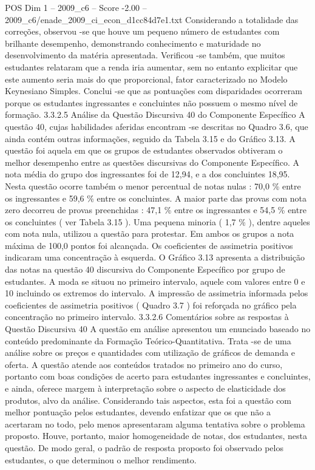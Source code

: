 \begin{textsample}{POS Dim 1 – 2009\_c6 – Score -2.00 – 2009\_c6/enade\_2009\_ci\_econ\_d1cc84d7e1.txt}
Considerando a totalidade das correções, observou -se que houve um pequeno número de estudantes com brilhante desempenho, demonstrando conhecimento e maturidade no desenvolvimento da matéria apresentada.
Verificou -se também, que muitos estudantes relataram que a renda iria aumentar, sem no entanto explicitar que este aumento seria mais do que proporcional, fator caracterizado no Modelo Keynesiano Simples.
Conclui -se que as pontuações com disparidades ocorreram porque os estudantes ingressantes e concluintes não possuem o mesmo nível de formação. 3.3.2.5 Análise da Questão Discursiva 40 do Componente Específico A questão 40, cujas habilidades aferidas encontram -se descritas no Quadro 3.6, que ainda contém outras informações, seguido da Tabela 3.15 e do Gráfico 3.13.
A questão foi aquela em que os grupos de estudantes observados obtiveram o melhor desempenho entre as questões discursivas do Componente Específico.
A nota média do grupo dos ingressantes foi de 12,94, e a dos concluintes 18,95.
Nesta questão ocorre também o menor percentual de notas nulas : 70,0 \% entre os ingressantes e 59,6 \% entre os concluintes.
A maior parte das provas com nota zero decorreu de provas preenchidas : 47,1 \% entre os ingressantes e 54,5 \% entre os concluintes ( ver Tabela 3.15 ).
Uma pequena minoria ( 1,7 \% ), dentre aqueles com nota nula, utilizou a questão para protestar.
Em ambos os grupos a nota máxima de 100,0 pontos foi alcançada.
Os coeficientes de assimetria positivos indicaram uma concentração à esquerda.
O Gráfico 3.13 apresenta a distribuição das notas na questão 40 discursiva do Componente Específico por grupo de estudantes.
A moda se situou no primeiro intervalo, aquele com valores entre 0 e 10 incluindo os extremos do intervalo.
A impressão de assimetria informada pelos coeficientes de assimetria positivos ( Quadro 3.7 ) foi reforçada no gráfico pela concentração no primeiro intervalo. 3.3.2.6 Comentários sobre as respostas à Questão Discursiva 40 A questão em análise apresentou um enunciado baseado no conteúdo predominante da Formação Teórico-Quantitativa.
Trata -se de uma análise sobre os preços e quantidades com utilização de gráficos de demanda e oferta.
A questão atende aos conteúdos tratados no primeiro ano do curso, portanto com boas condições de acerto para estudantes ingressantes e concluintes, e ainda, oferece margem à interpretação sobre o aspecto de elasticidade dos produtos, alvo da análise.
Considerando tais aspectos, esta foi a questão com melhor pontuação pelos estudantes, devendo enfatizar que os que não a acertaram no todo, pelo menos apresentaram alguma tentativa sobre o problema proposto.
Houve, portanto, maior homogeneidade de notas, dos estudantes, nesta questão.
De modo geral, o padrão de resposta proposto foi observado pelos estudantes, o que determinou o melhor rendimento.

\end{textsample}
